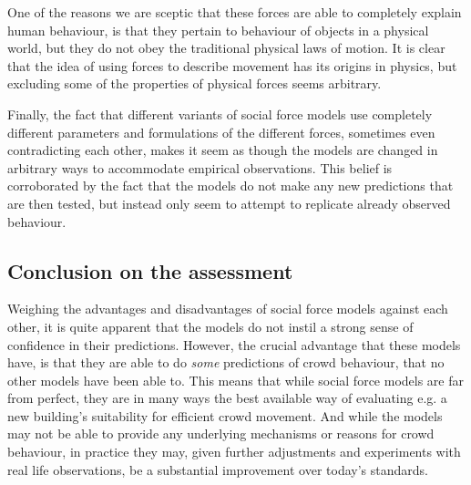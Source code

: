 One of the reasons we are sceptic that these forces are able to completely 
explain human behaviour, is that they pertain to behaviour of objects in a 
physical world, but they do not obey the traditional physical laws of motion.  
It is clear that the idea of using forces to describe movement has its origins 
in physics, but excluding some of the properties of physical forces seems 
arbitrary.

Finally, the fact that different variants of social force models use 
completely different parameters and formulations of the different forces, 
sometimes even contradicting each other, makes it seem as though the models 
are changed in arbitrary ways to accommodate empirical observations. This 
belief is corroborated by the fact that the models do not make any new 
predictions that are then tested, but instead only seem to attempt to 
replicate already observed behaviour.

\subsection{Conclusion on the assessment}
Weighing the advantages and disadvantages of social force models against each 
other, it is quite apparent that the models do not instil a strong sense of 
confidence in their predictions. However, the crucial advantage that these 
models have, is that they are able to do \emph{some} predictions of crowd 
behaviour, that no other models have been able to. This means that while 
social force models are far from perfect, they are in many ways the best 
available way of evaluating e.g. a new building's suitability for efficient 
crowd movement. And while the models may not be able to provide any underlying 
mechanisms or reasons for crowd behaviour, in practice they may, given further 
adjustments and experiments with real life observations, be a substantial 
improvement over today's standards.
